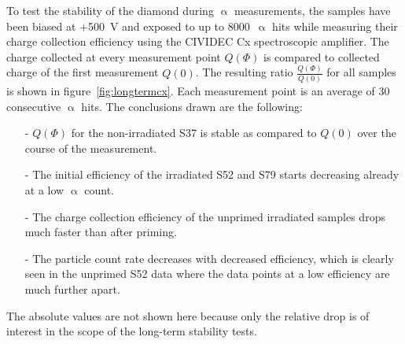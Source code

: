 To test the stability of the diamond during $\upalpha$ measurements, the samples have been biased at +500~V and exposed to up to 8000~$\upalpha$ hits while measuring their charge collection efficiency using the CIVIDEC Cx spectroscopic amplifier. The charge collected at every measurement point $Q(\Phi)$ is compared to collected charge of the first measurement $Q(0)$. The resulting ratio $\frac{Q(\Phi)}{Q(0)}$ for all samples is shown in figure~\ref{fig:longtermcx}. Each measurement point is an average of 30 consecutive $\upalpha$ hits. The conclusions drawn are the following:
\begin{itemize}
\item[-] $Q(\Phi)$ for the non-irradiated S37 is stable as compared to $Q(0)$ over the course of the measurement.
\item[-] The initial efficiency of the irradiated S52 and S79 starts decreasing already at a low $\upalpha$ count.
\item[-] The charge collection efficiency of the unprimed irradiated samples drops much faster than after priming.
\item[-] The particle count rate decreases with decreased efficiency, which is clearly seen in the unprimed S52 data where the data points at a low efficiency are much further apart.
\end{itemize}
The absolute values are not shown here because only the relative drop is of interest in the scope of the long-term stability tests.
